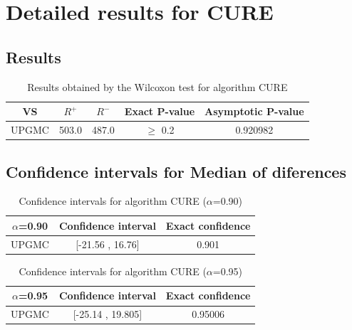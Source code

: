 \documentclass[a4paper,10pt]{article}
\begin{document}
 \clearpage 


\section{Detailed results for CURE}


\subsection{Results}

\begin{table}[!htp]
\centering\small
\begin{tabular}{
|c|c|c|c|c|}
\hline
 VS & $R^{+}$ & $R^{-}$ & Exact P-value & Asymptotic P-value \\ \hline 
UPGMC & 503.0 & 487.0 & $\geq$ 0.2 & 0.920982\\ \hline 

\end{tabular}
\caption{Results obtained by the Wilcoxon test for algorithm CURE}
\end{table}

\subsection{Confidence intervals for Median of diferences}

\begin{table}[!htp]
\centering\small
\begin{tabular}{
|c|c|c|}
\hline
 $\alpha$=0.90 & Confidence interval & Exact confidence \\ \hline 
UPGMC & [-21.56 , 16.76] & 0.901\\ \hline 

\end{tabular}
\caption{Confidence intervals for algorithm CURE ($\alpha$=0.90)}
\end{table}
\begin{table}[!htp]
\centering\small
\begin{tabular}{
|c|c|c|}
\hline
 $\alpha$=0.95 & Confidence interval & Exact confidence \\ \hline 
UPGMC & [-25.14 , 19.805] & 0.95006\\ \hline 

\end{tabular}
\caption{Confidence intervals for algorithm CURE ($\alpha$=0.95)}
\end{table}

 \clearpage 
\end{document}
